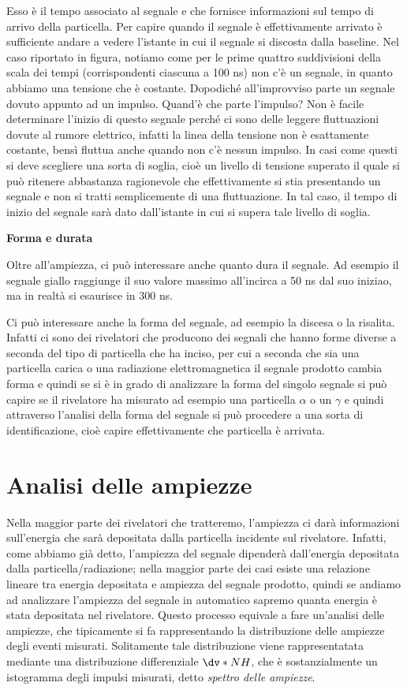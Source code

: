 Esso è il tempo associato al segnale e che fornisce informazioni sul tempo di arrivo della particella. Per capire quando il segnale è effettivamente arrivato è sufficiente andare a vedere l'istante in cui il segnale si discosta dalla baseline. Nel caso riportato in figura, notiamo come per le prime quattro suddivisioni della scala dei tempi (corrispondenti ciascuna a 100 ns) non c'è un segnale, in quanto abbiamo una tensione che è costante. Dopodiché all'improvviso parte un segnale dovuto appunto ad un impulso. Quand'è che parte l'impulso? Non è facile determinare l'inizio di questo segnale perché ci sono delle leggere fluttuazioni dovute al rumore elettrico, infatti la linea della tensione non è esattamente costante, bensì fluttua anche quando non c'è nessun impulso. In casi come questi si deve scegliere una sorta di soglia, cioè un livello di tensione superato il quale si può ritenere abbastanza ragionevole che effettivamente si stia presentando un segnale e non si tratti semplicemente di una fluttuazione. In tal caso, il tempo di inizio del segnale sarà dato dall'istante in cui si supera tale livello di soglia.

\vspace{0.2cm}\textbf{Forma e durata}

Oltre all'ampiezza, ci può interessare anche quanto dura il segnale. Ad esempio il segnale giallo raggiunge il suo valore massimo all'incirca a 50 ns dal suo iniziao, ma in realtà si esaurisce in 300 ns.

Ci può interessare anche la forma del segnale, ad esempio la discesa o la risalita. Infatti ci sono dei rivelatori che producono dei segnali che hanno forme diverse a seconda del tipo di particella che ha inciso, per cui a seconda che sia una particella carica o una radiazione elettromagnetica il segnale prodotto cambia forma e quindi se si è in grado di analizzare la forma del singolo segnale si può capire se il rivelatore ha misurato ad esempio una particella $\alpha$ o un $\gamma$ e quindi attraverso l'analisi della forma del segnale si può procedere a una sorta di identificazione, cioè capire effettivamente che particella è arrivata.

\section{Analisi delle ampiezze}

Nella maggior parte dei rivelatori che tratteremo, l'ampiezza ci darà informazioni sull'energia che sarà depositata dalla particella incidente sul rivelatore. Infatti, come abbiamo già detto, l'ampiezza del segnale dipenderà dall'energia depositata dalla particella/radiazione; nella maggior parte dei casi esiste una relazione lineare tra energia depositata e ampiezza del segnale prodotto, quindi se andiamo ad analizzare l'ampiezza del segnale in automatico sapremo quanta energia è stata depositata nel rivelatore. Questo processo equivale a fare un'analisi delle ampiezze, che tipicamente si fa rappresentando la distribuzione delle ampiezze degli eventi misurati. Solitamente tale distribuzione viene rappresentatata mediante una distribuzione differenziale $\dv*{N}{H}$, che è sostanzialmente un istogramma degli impulsi misurati, detto \textit{spettro delle ampiezze}.

